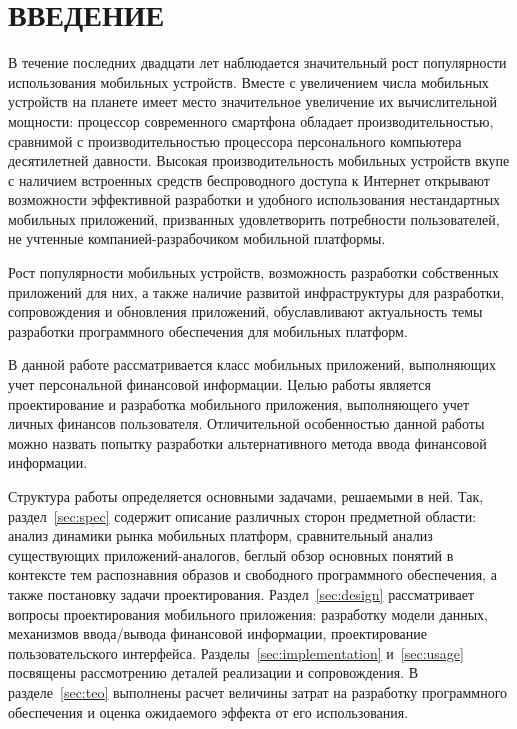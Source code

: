 \section*{ВВЕДЕНИЕ}

В течение последних двадцати лет наблюдается значительный рост
популярности использования мобильных устройств.
Вместе с увеличением числа мобильных устройств на планете имеет место
значительное увеличение их вычислительной мощности:
процессор современного смартфона обладает производительностью,
сравнимой с производительностью процессора персонального
компьютера десятилетней давности.
Высокая производительность мобильных устройств вкупе с наличием
встроенных средств беспроводного доступа к Интернет открывают
возможности эффективной разработки и удобного использования
нестандартных мобильных приложений, призванных удовлетворить
потребности пользователей, не учтенные компанией-разрабочиком
мобильной платформы.

Рост популярности мобильных устройств, возможность разработки собственных
приложений для них, а также наличие развитой инфраструктуры для разработки,
сопровождения и обновления приложений, обуславливают актуальность темы
разработки программного обеспечения для мобильных платформ.

В данной работе рассматривается класс мобильных приложений,
выполняющих учет персональной финансовой информации.
Целью работы является проектирование и разработка мобильного приложения,
выполняющего учет личных финансов пользователя.
Отличительной особенностью данной работы можно назвать попытку разработки
альтернативного метода ввода финансовой информации.

Структура работы определяется основными задачами, решаемыми в ней.
Так, раздел~\ref{sec:spec} содержит описание различных сторон предметной области:
анализ динамики рынка мобильных платформ, сравнительный анализ существующих
приложений-аналогов, беглый обзор основных понятий в контексте тем распознавния
образов и свободного программного обеспечения, а также постановку задачи проектирования.
Раздел~\ref{sec:design} рассматривает вопросы проектирования мобильного приложения:
разработку модели данных, механизмов ввода/вывода финансовой информации,
проектирование пользовательского интерфейса.
Разделы~\ref{sec:implementation} и~\ref{sec:usage} посвящены рассмотрению деталей
реализации и сопровождения. В разделе~\ref{sec:teo} выполнены расчет
величины затрат на разработку программного обеспечения и оценка ожидаемого эффекта
от его использования.
